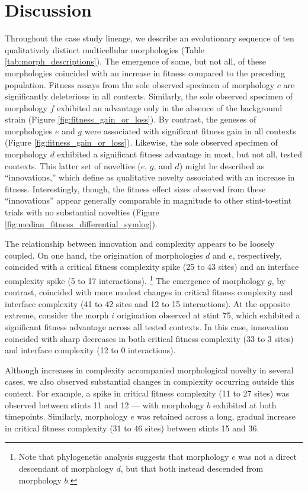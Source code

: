 \section{Discussion}

Throughout the case study lineage, we describe an evolutionary sequence of ten qualitatively distinct multicellular morphologies (Table \ref{tab:morph_descriptions}).
The emergence of some, but not all, of these morphologies coincided with an increase in fitness compared to the preceding population.
Fitness assays from the sole observed specimen of morphology $c$ are significantly deleterious in all contexts.
Similarly, the sole observed specimen of morphology $f$ exhibited an advantage only in the absence of the background strain (Figure \ref{fig:fitness_gain_or_loss}).
By contrast, the geneses of morphologies $e$ and $g$ were associated with significant fitness gain in all contexts (Figure \ref{fig:fitness_gain_or_loss}).
Likewise, the sole observed specimen of morphology $d$ exhibited a significant fitness advantage in most, but not all, tested contexts.
This latter set of novelties ($e$, $g$, and $d$) might be described as ``innovations,'' which \citet{hochberg2017innovation} define as qualitative novelty associated with an increase in fitness.
Interestingly, though, the fitness effect sizes observed from these ``innovations'' appear generally comparable in magnitude to other stint-to-stint trials with no substantial novelties (Figure \ref{fig:median_fitness_differential_symlog}).

The relationship between innovation and complexity appears to be loosely coupled.
On one hand, the origination of morphologies $d$ and $e$, respectively, coincided with a critical fitness complexity spike (25 to 43 sites) and an interface complexity spike (5 to 17 interactions).%
\footnote{Note that phylogenetic analysis suggests that morphology $e$ was not a direct descendant of morphology $d$, but that both instead descended from morphology $b$.}
The emergence of morphology $g$, by contrast, coincided with more modest changes in critical fitness complexity and interface complexity (41 to 42 sites and 12 to 15 interactions). 
At the opposite extreme, consider the morph $i$ origination observed at stint 75, which exhibited a significant fitness advantage across all tested contexts.
In this case, innovation coincided with sharp decreases in both critical fitness complexity (33 to 3 sites) and interface complexity (12 to 0 interactions).

Although increases in complexity accompanied morphological novelty in several cases, we also observed substantial changes in complexity occurring outside this context.
For example, a spike in critical fitness complexity (11 to 27 sites) was observed between stints 11 and 12 --- with morphology $b$ exhibited at both timepoints.
Similarly, morphology $e$ was retained across a long, gradual increase in critical fitness complexity (31 to 46 sites) between stints 15 and 36.

